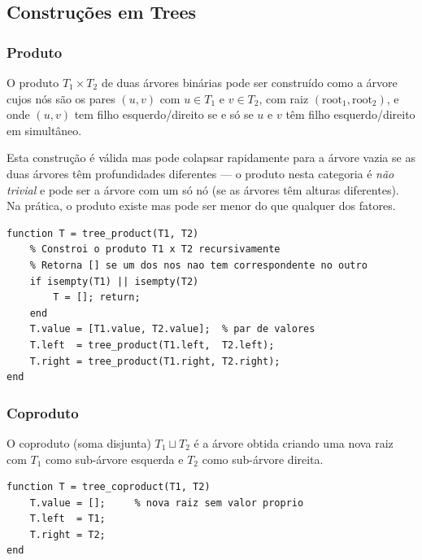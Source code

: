 \subsection{Construções em \textbf{Trees}}
\label{subsec:trees-constructions}

\subsubsection{Produto}

\begin{proposition}
O produto $T_1 \times T_2$ de duas árvores binárias pode ser construído como a árvore cujos nós são os pares $(u, v)$ com $u \in T_1$ e $v \in T_2$, com raiz $(\text{root}_1, \text{root}_2)$, e onde $(u,v)$ tem filho esquerdo/direito se e só se $u$ e $v$ têm filho esquerdo/direito em simultâneo.
\end{proposition}

\begin{remark}
Esta construção é válida mas pode colapsar rapidamente para a árvore vazia se as duas árvores têm profundidades diferentes --- o produto nesta categoria é \emph{não trivial} e pode ser a árvore com um só nó (se as árvores têm alturas diferentes). Na prática, o produto existe mas pode ser menor do que qualquer dos fatores.
\end{remark}

\begin{lstlisting}[style=matlab, caption={Produto de duas árvores binárias (representação recursiva)}]
function T = tree_product(T1, T2)
    % Constroi o produto T1 x T2 recursivamente
    % Retorna [] se um dos nos nao tem correspondente no outro
    if isempty(T1) || isempty(T2)
        T = []; return;
    end
    T.value = [T1.value, T2.value];  % par de valores
    T.left  = tree_product(T1.left,  T2.left);
    T.right = tree_product(T1.right, T2.right);
end
\end{lstlisting}

\subsubsection{Coproduto}

\begin{proposition}
O coproduto (soma disjunta) $T_1 \sqcup T_2$ é a árvore obtida criando uma nova raiz com $T_1$ como sub-árvore esquerda e $T_2$ como sub-árvore direita.
\end{proposition}

\begin{lstlisting}[style=matlab, caption={Coproduto de duas árvores binárias}]
function T = tree_coproduct(T1, T2)
    T.value = [];     % nova raiz sem valor proprio
    T.left  = T1;
    T.right = T2;
end
\end{lstlisting}

